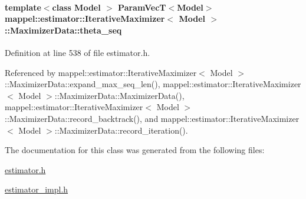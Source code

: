 \paragraph[{\texorpdfstring{theta\+\_\+seq}{theta_seq}}]{\setlength{\rightskip}{0pt plus 5cm}template$<$class Model $>$ {\bf Param\+VecT}$<$Model$>$ {\bf mappel\+::estimator\+::\+Iterative\+Maximizer}$<$ Model $>$\+::Maximizer\+Data\+::theta\+\_\+seq\hspace{0.3cm}{\ttfamily [protected]}}\hypertarget{classmappel_1_1estimator_1_1IterativeMaximizer_1_1MaximizerData_a7fd34d49221c35e0e5977b8349c543c5}{}\label{classmappel_1_1estimator_1_1IterativeMaximizer_1_1MaximizerData_a7fd34d49221c35e0e5977b8349c543c5}


Definition at line 538 of file estimator.\+h.



Referenced by mappel\+::estimator\+::\+Iterative\+Maximizer$<$ Model $>$\+::\+Maximizer\+Data\+::expand\+\_\+max\+\_\+seq\+\_\+len(), mappel\+::estimator\+::\+Iterative\+Maximizer$<$ Model $>$\+::\+Maximizer\+Data\+::\+Maximizer\+Data(), mappel\+::estimator\+::\+Iterative\+Maximizer$<$ Model $>$\+::\+Maximizer\+Data\+::record\+\_\+backtrack(), and mappel\+::estimator\+::\+Iterative\+Maximizer$<$ Model $>$\+::\+Maximizer\+Data\+::record\+\_\+iteration().



The documentation for this class was generated from the following files\+:\begin{DoxyCompactItemize}
\item 
\hyperlink{estimator_8h}{estimator.\+h}\item 
\hyperlink{estimator__impl_8h}{estimator\+\_\+impl.\+h}\end{DoxyCompactItemize}

